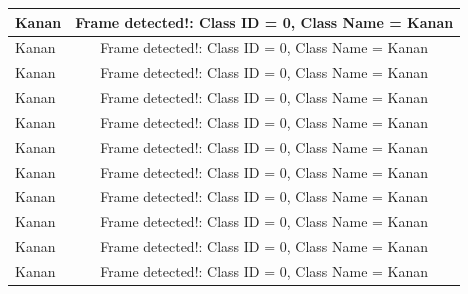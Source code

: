 \begin{longtable}{|l|c|}
  Kanan          & Frame detected!: Class ID = 0, Class Name = Kanan \\ \hline
  Kanan          & Frame detected!: Class ID = 0, Class Name = Kanan \\ \hline
  Kanan          & Frame detected!: Class ID = 0, Class Name = Kanan \\ \hline
  Kanan          & Frame detected!: Class ID = 0, Class Name = Kanan \\ \hline
  Kanan          & Frame detected!: Class ID = 0, Class Name = Kanan \\ \hline
  Kanan          & Frame detected!: Class ID = 0, Class Name = Kanan \\ \hline
  Kanan          & Frame detected!: Class ID = 0, Class Name = Kanan \\ \hline
  Kanan          & Frame detected!: Class ID = 0, Class Name = Kanan \\ \hline
  Kanan          & Frame detected!: Class ID = 0, Class Name = Kanan \\ \hline
  Kanan          & Frame detected!: Class ID = 0, Class Name = Kanan \\ \hline
  Kanan          & Frame detected!: Class ID = 0, Class Name = Kanan \\ \hline
\end{longtable}

